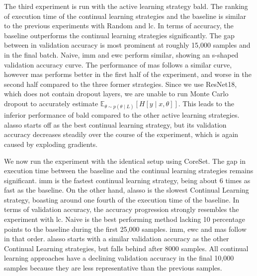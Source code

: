 The third experiment is run with the active learning strategy \gls{bald}. The ranking of execution time of the continual
learning strategies and the baseline is similar to the previous experiments with Random and \gls{lc}. In terms of accuracy, the baseline outperforms the continual learning strategies significantly. The gap between
in validation accuracy is most prominent at roughly 15,000 samples and in the final batch. Naive, \gls{imm} and \gls{ewc} perform similar, showing an
s-shaped validation accuracy curve. The performance of \gls{mas} follows a similar curve, however \gls{mas} performs better in the first half of the experiment, and worse in the second half compared to the
three former strategies. Since we use ResNet18, which does not contain dropout layers, we are unable to run Monte Carlo dropout to accurately estimate $\mathbb{E}_{\theta \sim p(\theta \mid L)} [H[y \mid x, \theta]]$.
This leads to the inferior performance of \gls{bald} compared to the other active learning strategies. \gls{alasso} starts off as
the best continual learning strategy, but its validation accuracy decreases steadily over the course of the experiment, which is again caused by exploding gradients. \par 



We now run the experiment with the identical setup using CoreSet. The gap in execution time between the baseline and the continual learning 
strategies remains significant. \gls{imm} is the fastest continual learning strategy, being about 6 times as fast as the baseline. On the other hand, \gls{alasso} is the slowest Continual Learning strategy,
boasting around one fourth of the execution time of the baseline. In terms of validation accuracy, the accuracy progression strongly resembles the experiment with \gls{lc}. Naive is the best performing method
lacking 10 percentage points to the baseline during the first 25,000 samples. \gls{imm}, \gls{ewc} and \gls{mas} follow in that order. \gls{alasso} starts with a similar validation accuracy
as the other Continual Learning strategies, but falls behind after 8000 samples. All continual learning approaches have a declining validation accuracy in the final 10,000 samples because they are less representative
than the previous samples. \par



